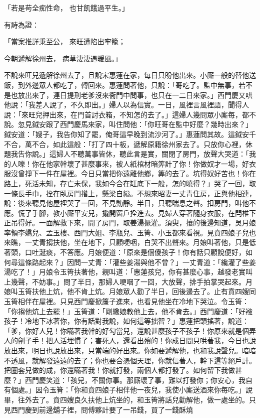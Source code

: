 \begin{showcontents}{}
「若是苟全痴性命，  也甘飢餓過平生。」

有詩為證：

「當案推詳秉至公，  來旺遭陷出牢籠；

今朝遞解徐州去，  病草淒淒遇暖風。」

不說來旺兒遞解徐州去了，且說宋惠蓮在家，每日只盼他出來。小廝一般的替他送飯，到外邊眾人都吃了，轉回來。惠蓮問著他，只說：「哥吃了。監中無事，若不是也放出來了，連日提刑老爹沒來衙門中問事，也只在一二日來家。」西門慶又哄他說：「我差人說了，不久即出。」婦人以為信實。一日，風裡言風裡語，聞得人說：「來旺兒押出來，在門首討衣箱，不知怎的去了。」這婦人幾問眾小廝每，都不說。忽見鉞安跟了西門慶馬來家，叫住問他：「你旺哥在監中好麼？幾時出來？」鉞安道：「嫂子，我告你知了罷，俺哥這早晚到流沙河了。」惠蓮問其故。這鉞安千不合，萬不合，如此這般：「打了四十板，遞解原籍徐州家去了。只放你心裡，休題我告你說。」這婦人不聽萬事皆休，聽此言是實，關閉了房門，放聲大哭道：「我的人嚛！你在他家幹壞了甚麼事來，被人紙棺材暗筭計了你！你做奴才一場，好衣服沒曾掙下一件在屋裡。今日只當把你遠離他鄉，筭的去了。坑得奴好苦也！你在路上，死活未知，存亡未保，我如今合在缸底下一般，怎的曉得？」哭了一回，取一條長手巾，拴在臥房門揝上，懸梁自縊。不想來昭妻一丈青住房，正與他相連，說：後來聽見他屋裡哭了一回，不見動靜。半日，只聽喘息之聲。扣房門，叫他不應。慌了手腳，教小廝平安兒，撬開窗戶拴進去。見婦人穿著隨身衣服，在閂椎下正吊得好。一面解救下來，開了房門，取姜湯撅灌。須臾，攘的後邊知道，吳月娘率領李嬌兒、孟玉樓、西門大姐、李瓶兒、玉筲、小玉都來看視。見賁四娘子兒也來瞧，一丈青搊扶他，坐在地下，只顧哽咽，白哭不出聲來。月娘叫著他，只是低著頭，口吐涎痰，不答應。月娘便道：「原來是個傻孩子！你有話只顧說便好，如何尋這條路起來？」因問一丈青：「灌些姜湯與他不曾？」一丈青道：「纔灌了些姜湯吃了！」月娘令玉筲扶著他，親叫道：「惠蓮孩兒，你有甚麼心事，越發老實叫上幾聲，不妨事。」問了半日，那婦人哽咽了一回，大放聲，排手拍掌哭起來。月娘叫玉筲扶他上炕，他不肯上炕。月娘眾人勸了半日，回後邊去了。止有賁四嫂同玉筲相伴在屋裡。只見西門慶掀簾子進來，也看見他坐在冷地下哭泣。令玉筲：「你搊他炕上去罷！」玉筲道：「剛纔娘教他上去，他不肯去。」西門慶道：「好襁孩子！冷地下冰著你，你有話對我說，如何這等拙智？」惠蓮把頭搖著，說道：「爹，你好人兒！你瞞著我幹的好勾當兒，還說甚麼孩子不孩子！你原來就是個弄人的劊子手！把人活埋慣了；害死人，還看出殯的！你成日間只哄著我，今日也說放出來，明日也說放出來，只當端的好出來。你如要遞解他，也和我說聲兒。暗暗不透風，就解發遠遠的去了；你也要合憑個天理，你就信著人，幹下這等絕戶計。把圈套兒做的成，你還瞞著我！你就打發，兩個人都打發了。如何留下我做甚麼？」西門慶笑道：「孩兒，不關你事。那廝壞了事，難以打發你；你安心，我自有個處。」因令玉筲：「你和賁四娘子相伴他一夜兒，我使小廝送酒來你每吃。」說畢，往外去了。賁四嫂良久扶他上炕坐的，和玉筲將話兒勸解他，做一處坐的。只見西門慶到前邊舖子裡，問傅夥計要了一吊錢，買了一錢酥燒 
\end{showcontents}
